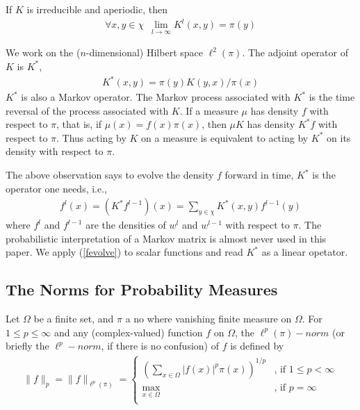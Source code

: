 \documentclass{article}
\begin{document}
If $K$ is irreducible and aperiodic, then
\begin{eqnarray*}
\forall x,y \in \chi \,\,\, \lim_{l \rightarrow \infty}
K^l(x,y)=\pi(y)
\end{eqnarray*}

We work on the ($n$-dimensional) Hilbert space $\ell^2(\pi)$. The adjoint operator of $K$ is $K^*$,
\begin{eqnarray*}
\label{Kadjoint}
  K^*(x,y) = \pi(y)K(y,x)/\pi(x)
\end{eqnarray*}
$K^*$ is also a Markov operator. The Markov process associated with $K^*$ is the time reversal of the process associated with $K$. If a measure $\mu$ has density $f$ with respect to $\pi$, that is, if $\mu(x)=f(x)\pi(x)$, then $\mu K$ has density $K^*f$ with respect to $\pi$. Thus acting by $K$ on a measure is equivalent to acting by
$K^*$ on its density with respect to $\pi$.

The above observation says to evolve the density $f$ forward in time, $K^*$ is the operator one needs, i.e.,
\begin{eqnarray}
\label{fevolve}
f^l(x) =  (K^*f^{l-1})(x)= \sum_{y \in \chi}
K^*(x,y)f^{l-1}(y)
\end{eqnarray}
where $f^l$ and $f^{l-1}$ are the densities of $w^l$ and $w^{l-1}$
with respect to $\pi$. The probabilistic interpretation of a Markov matrix is almost never used in this paper. We apply (\ref{fevolve}) to scalar functions and read $K^*$ as a linear opetator.    

\subsection{The Norms for Probability Measures}

Let $\Omega$ be a finite set, and $\pi$ a no where vanishing finite measure on $\Omega$. For $1 \le p \le \infty$ and any (complex-valued) function $f$ on $\Omega$, the $\ell^p(\pi)-norm$ (or briefly the $\ell^p-norm$, if there is no confusion) of $f$ is defined by
\begin{eqnarray}
\label{lpnorm}
  \|f\|_p = \|f\|_{\ell^p(\pi)} =   \left\{ \begin{array}{cc}
                 \left(   \sum_{x \in \Omega} |f(x)|^p \pi(x) \right)^{1/p} &\mbox{, if } 1\le p<\infty\\
                 \max_{x \in \Omega} &\mbox{, if } p = \infty\\
              \end{array} \right.
\end{eqnarray}
\end{document}
